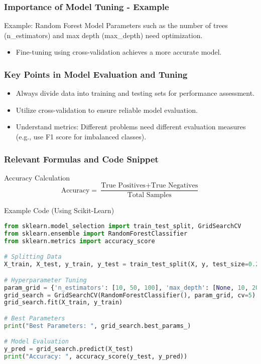 \documentclass[aspectratio=169]{beamer}
\begin{document}
\begin{frame}[fragile]
    \frametitle{Importance of Model Tuning - Example}
    \begin{block}{Example: Random Forest Model}
        Parameters such as the number of trees (n\_estimators) and max depth (max\_depth) need optimization.
    \end{block}
    \begin{itemize}
        \item Fine-tuning using cross-validation achieves a more accurate model.
    \end{itemize}
\end{frame}

\begin{frame}[fragile]
    \frametitle{Key Points in Model Evaluation and Tuning}
    \begin{itemize}
        \item Always divide data into training and testing sets for performance assessment.
        \item Utilize cross-validation to ensure reliable model evaluation.
        \item Understand metrics: Different problems need different evaluation measures (e.g., use F1 score for imbalanced classes).
    \end{itemize}
\end{frame}

\begin{frame}[fragile]
    \frametitle{Relevant Formulas and Code Snippet}
    \begin{block}{Accuracy Calculation}
        \begin{equation}
            \text{Accuracy} = \frac{\text{True Positives} + \text{True Negatives}}{\text{Total Samples}}
        \end{equation}
    \end{block}
    \begin{block}{Example Code (Using Scikit-Learn)}
    \begin{lstlisting}[language=Python]
from sklearn.model_selection import train_test_split, GridSearchCV
from sklearn.ensemble import RandomForestClassifier
from sklearn.metrics import accuracy_score

# Splitting Data
X_train, X_test, y_train, y_test = train_test_split(X, y, test_size=0.2, random_state=42)

# Hyperparameter Tuning
param_grid = {'n_estimators': [10, 50, 100], 'max_depth': [None, 10, 20, 30]}
grid_search = GridSearchCV(RandomForestClassifier(), param_grid, cv=5)
grid_search.fit(X_train, y_train)

# Best Parameters
print("Best Parameters: ", grid_search.best_params_)

# Model Evaluation
y_pred = grid_search.predict(X_test)
print("Accuracy: ", accuracy_score(y_test, y_pred))
    \end{lstlisting}
    \end{block}
\end{frame}
\end{document}
